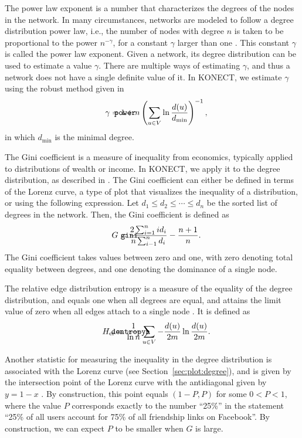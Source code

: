 \documentclass{article}
\def\mathnote#1{%
  \tag*{\rlap{\hspace\marginparsep\smash{\parbox[t]{\marginparwidth}{#1}}}}
}
\begin{document}
The power law exponent is a number that characterizes the degrees of the
nodes in the network.  In many circumstances, networks are modeled to
follow a degree distribution power law, i.e., the number of nodes with
degree $n$ is taken to be proportional to the power $n^{-\gamma}$, for a
constant $\gamma$ larger than one \citep{b439}.  This constant $\gamma$
is called the power law exponent.  Given a network, its degree
distribution can be used to estimate a value $\gamma$.  There are
multiple ways of estimating $\gamma$, and thus a network does not have a
single definite value of it. In KONECT, we estimate $\gamma$ using the
robust method given in \citep[Eq.~5]{b408}
\begin{align}
  \mathnote{\texttt{power}} \gamma &= 1 + n \left( \sum_{u\in V} \ln
  \frac {d(u)} {d_{\min}} \right) ^{-1},
\end{align}
in which $d_{\min}$ is the minimal degree.

The Gini coefficient is a measure of inequality from economics,
typically applied to distributions of wealth or income.  In KONECT, we
apply it to the degree distribution, as described in
\citep{kunegis:power-law}.  The Gini coefficient can either be defined in
terms of the Lorenz curve, a type of plot that visualizes the inequality
of a distribution, or using the following expression.  Let $d_1 \leq d_2
\leq \dotsb \leq d_{n}$ be the sorted list of degrees in the
network. Then, the Gini coefficient is defined as
\begin{align}
  \mathnote{\texttt{gini}} G &= \frac {2 \sum_{i=1}^{n} i d_i} {n
    \sum_{i-1}^{n} d_i} - \frac {n+1} {n}.
\end{align}
The Gini coefficient takes values between zero and one, with zero
denoting total equality between degrees, and one denoting the dominance
of a single node.

The relative edge distribution entropy is a measure of the equality of
the degree distribution, and equals one when all degrees are equal, and
attains the limit value of zero when all edges attach to a single node
\citep{kunegis:power-law}.  It is defined as
\begin{align}
  \mathnote{\texttt{dentropyn}} H_{\mathrm{er}} &= \frac 1 {\ln n}
  \sum_{u \in V} - \frac{d(u)}{2m} \ln \frac{d(u)}{2m}.
\end{align}

Another statistic for  measuring the inequality
in the degree distribution is associated with the Lorenz curve (see
Section~\ref{sec:plot:degree}), and is given by the intersection point
of the Lorenz curve with the antidiagonal given by $y = 1 - x$
\citep{kunegis:power-law}.  By construction, this point equals $(1-P, P)$
for some $0<P<1$, where the value $P$ corresponds exactly to the number
``25\%'' in the statement ``25\% of all users account for 75\% of all
friendship links on Facebook''.  By construction, we can expect $P$ to
be smaller when $G$ is large.
\end{document}
